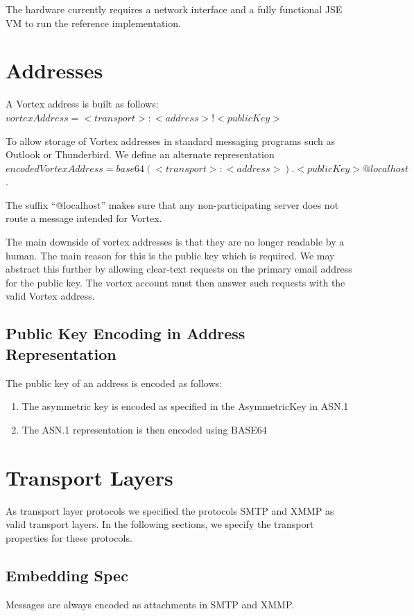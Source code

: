 The hardware currently requires a network interface and a fully functional JSE VM to run the reference implementation.

\section{Addresses}


A Vortex address is built as follows: $vortexAddress=<transport>:<address>!<publicKey>$

To allow storage of Vortex addresses in standard messaging programs such as Outlook or Thunderbird. We define an alternate representation $encodedVortexAddress=base64(<transport>:<address>).<publicKey>@localhost$. 

The suffix ``@localhost'' makes sure that any non-participating server does not route a message intended for Vortex.

The main downside of vortex addresses is that they are no longer readable by a human. The main reason for this is the public key which is required. We may abstract this further by allowing clear-text requests on the primary email address for the public key. The vortex account must then answer such requests with the valid Vortex address.

\subsection{Public Key Encoding in Address Representation}
The public key of an address is encoded as follows:
\begin{enumerate}
	\item The asymmetric key is encoded as specified in the AsymmetricKey in ASN.1
	\item The ASN.1 representation is then encoded using BASE64
\end{enumerate}    

\section{Transport Layers}                                          
As transport layer protocols we specified the protocols SMTP and XMMP as valid transport layers. In the following sections, we specify the transport properties for these protocols.

\subsection{Embedding Spec}
Messages are always encoded as attachments in SMTP and XMMP. 

